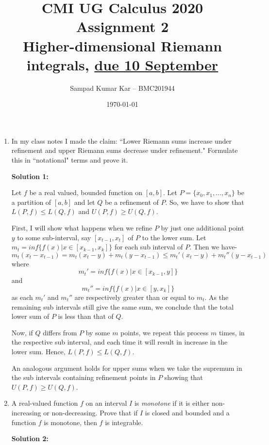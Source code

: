 \documentclass[11pt]{amsart}
\theoremstyle{definition}
\begin{document}
\title{CMI UG Calculus 2020 Assignment 2\\
 {\tiny Higher-dimensional Riemann integrals, \underline{due 10 September}}}
\author{Sampad Kumar Kar -- BMC201944}
\date{\today}
\maketitle

\begin{enumerate}[wide, labelwidth=!, labelindent=0pt]

\item  In my class notes I made the claim: ``Lower Riemann sums increase under refinement and upper Riemann sums decrease under refinement." Formulate this in ``notational" terms and prove it.

\textbf{Solution 1:}

Let $f$ be a real valued, bounded function on $[a,b]$.
Let $P = \{x_0,x_1,...,x_n\}$ be a partition of $[a,b]$ and let $Q$ be a refinement of $P$. So, we have to show that $L(P,f)\le L(Q,f)$ and $U(P,f) \ge U(Q,f)$.

First, I will show what happens when we refine $P$ by just one additional point $y$ to some sub-interval, say $[x_{t-1},x_t]$ of $P$ to the lower sum. Let $m_t = inf \{f(x) | x \in [x_{k-1},x_k]\}$ for each sub interval of $P$. Then we have-
$$m_t(x_t - x_{t-1}) = m_t(x_t - y) + m_t(y - x_{t-1}) \le m_t '(x_t - y) + m_t ''(y - x_{t-1})$$ where
$$m_t' = inf \{f(x) | x \in [x_{k-1},y]\}$$ and $$m_t'' = inf \{f(x) | x \in [y,x_k]\}$$ as each $m_t'$ and $m_t''$ are respectively greater than or equal to $m_t$. As the remaining sub intervals still give the same sum, we conclude that the total lower sum of $P$ is less than that of $Q$.

Now, if $Q$ differs from $P$ by some $m$ points, we repeat this process $m$ times, in the respective sub interval, and each time it will result in increase in the lower sum. Hence, $L(P,f)\le L(Q,f)$.

An analogous argument holds for upper sums when we take the supremum in the sub intervals containing refinement points in $P$ showing that $U(P,f) \ge U(Q,f)$.

\newpage
\item A real-valued function $f$ on an interval $I$ is \emph{monotone} if it is either non-increasing or non-decreasing. Prove that if $I$ is closed and bounded and a function $f$ is monotone, then $f$ is integrable.

\textbf{Solution 2:}


\end{enumerate}
\end{document}
